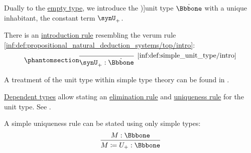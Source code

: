 \begin{definition}\label{def:simple_unit_type}\mimprovised
  Dually to the \hyperref[def:simple_empty_type]{empty type}, we introduce the \term[en=unit type (\cite[\S 4.3.4]{Mimram2020ProgramEqualsProof})]{unit type} \( \syn\Bbbone \) with a unique inhabitant, the constant term \( \synU_+ \).

  There is an \hyperref[rem:type_theory_rule_classification/intro]{introduction rule} resembling the verum rule \ref{inf:def:propositional_natural_deduction_systems/top/intro}:
  \begin{equation*}\taglabel[\ensuremath{ \Bbbone_+ }]{inf:def:simple_unit_type/intro}
    \begin{prooftree}
      \infer0[\ref{inf:def:simple_unit_type/intro}]{ \synU_+: \syn\Bbbone }
    \end{prooftree}
  \end{equation*}
\end{definition}
\begin{comments}
  \item A treatment of the unit type within simple type theory can be found in \cite[\S 4.3.2]{Mimram2020ProgramEqualsProof}.

  \item \hyperref[con:dependent_type]{Dependent types} allow stating an \hyperref[rem:type_theory_rule_classification/intro]{elimination rule} and \hyperref[rem:type_theory_rule_classification/equality/uniq]{uniqueness rule} for the unit type. See .

  A simple uniqueness rule can be stated using only simple types:
  \begin{equation*}
    \begin{prooftree}
      \hypo{ M: \Bbbone }
      \infer1{ M \coloneqq U_+: \Bbbone }
    \end{prooftree}
  \end{equation*}
\end{comments}

